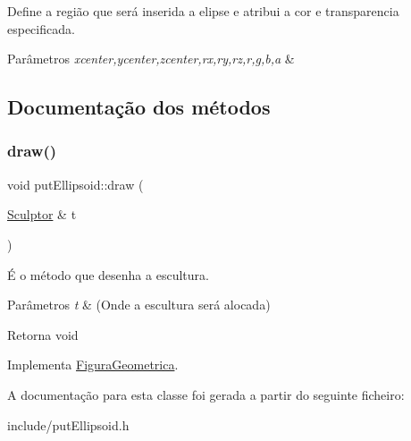 Define a região que será inserida a elipse e atribui a cor e transparencia especificada. 


\begin{DoxyParams}{Parâmetros}
{\em xcenter,ycenter,zcenter,rx,ry,rz,r,g,b,a} & \\
\hline
\end{DoxyParams}


\subsection{Documentação dos métodos}
\mbox{\label{classput_ellipsoid_a392bfa08917d452add21c19339d15e2c}} 
\subsubsection{\texorpdfstring{draw()}{draw()}}
{\footnotesize\ttfamily void put\+Ellipsoid\+::draw (\begin{DoxyParamCaption}\item[{\hyperlink{class_sculptor}{Sculptor} \&}]{t }\end{DoxyParamCaption})\hspace{0.3cm}{\ttfamily [virtual]}}



É o método que desenha a escultura. 


\begin{DoxyParams}{Parâmetros}
{\em t} & (Onde a escultura será alocada) \\
\hline
\end{DoxyParams}
\begin{DoxyReturn}{Retorna}
void 
\end{DoxyReturn}


Implementa \hyperlink{class_figura_geometrica_a34585fd7c0bd7378fc69c4ee208e676c}{Figura\+Geometrica}.



A documentação para esta classe foi gerada a partir do seguinte ficheiro\+:\begin{DoxyCompactItemize}
\item 
include/put\+Ellipsoid.\+h\end{DoxyCompactItemize}
